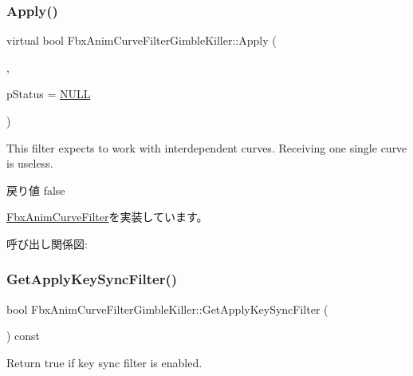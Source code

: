 \subsubsection{\texorpdfstring{Apply()}{Apply()}\hspace{0.1cm}{\footnotesize\ttfamily [5/5]}}
{\footnotesize\ttfamily virtual bool Fbx\+Anim\+Curve\+Filter\+Gimble\+Killer\+::\+Apply (\begin{DoxyParamCaption}\item[{\hyperlink{class_fbx_anim_curve}{Fbx\+Anim\+Curve} \&}]{,  }\item[{\hyperlink{class_fbx_status}{Fbx\+Status} $\ast$}]{p\+Status = {\ttfamily \hyperlink{fbxarch_8h_a070d2ce7b6bb7e5c05602aa8c308d0c4}{N\+U\+LL}} }\end{DoxyParamCaption})\hspace{0.3cm}{\ttfamily [virtual]}}

This filter expects to work with interdependent curves. Receiving one single curve is useless. \begin{DoxyReturn}{戻り値}
{\ttfamily false} 
\end{DoxyReturn}


\hyperlink{class_fbx_anim_curve_filter_a6a69996c47c0e6f63a0f8b0d5fa806a0}{Fbx\+Anim\+Curve\+Filter}を実装しています。

呼び出し関係図\+:
\mbox{\label{class_fbx_anim_curve_filter_gimble_killer_ae75014aea69ea161d87be698906ed797}} 
\subsubsection{\texorpdfstring{Get\+Apply\+Key\+Sync\+Filter()}{GetApplyKeySyncFilter()}}
{\footnotesize\ttfamily bool Fbx\+Anim\+Curve\+Filter\+Gimble\+Killer\+::\+Get\+Apply\+Key\+Sync\+Filter (\begin{DoxyParamCaption}{ }\end{DoxyParamCaption}) const}



Return {\ttfamily true} if key sync filter is enabled. 

\mbox{\label{class_fbx_anim_curve_filter_gimble_killer_a224d34ab4b2a7f508de5679402c3711f}} 
